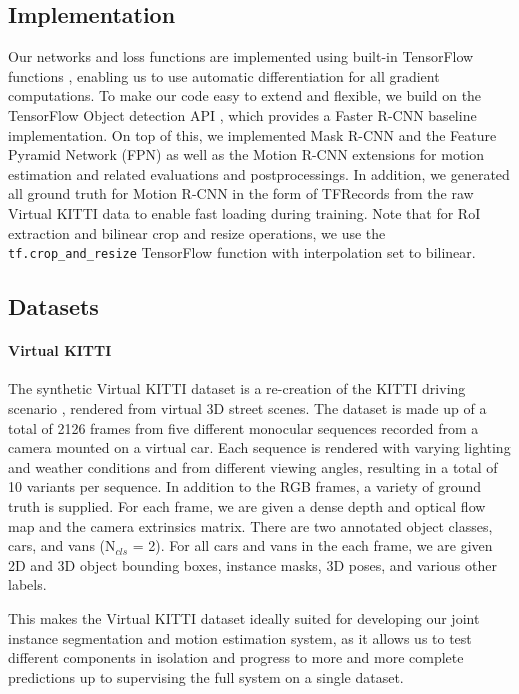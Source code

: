 \subsection{Implementation}
Our networks and loss functions are implemented using built-in TensorFlow
functions \cite{TensorFlow}, enabling us to use automatic differentiation for all gradient
computations. To make our code easy to extend and flexible, we build on
the TensorFlow Object detection API \cite{TensorFlowObjectDetection}, which provides a Faster R-CNN baseline
implementation.
On top of this, we implemented Mask R-CNN and the Feature Pyramid Network (FPN)
as well as the Motion R-CNN extensions for motion estimation and related evaluations
and postprocessings. In addition, we generated all ground truth for
Motion R-CNN in the form of TFRecords from the raw Virtual KITTI
data to enable fast loading during training.
Note that for RoI extraction and bilinear crop and resize operations,
we use the \texttt{tf.crop\_and\_resize} TensorFlow function with
interpolation set to bilinear.

\subsection{Datasets}
\label{ssec:datasets}

\paragraph{Virtual KITTI}
The synthetic Virtual KITTI dataset \cite{VKITTI} is a re-creation of the KITTI
driving scenario \cite{KITTI2012, KITTI2015}, rendered from virtual 3D street
scenes.
The dataset is made up of a total of 2126 frames from five different monocular
sequences recorded from a camera mounted on a virtual car.
Each sequence is rendered with varying lighting and weather conditions and
from different viewing angles, resulting in a total of 10 variants per sequence.
In addition to the RGB frames, a variety of ground truth is supplied.
For each frame, we are given a dense depth and optical flow map and the camera
extrinsics matrix. There are two annotated object classes, cars, and vans (N$_{cls}$ = 2).
For all cars and vans in the each frame, we are given 2D and 3D object bounding
boxes, instance masks, 3D poses, and various other labels.

This makes the Virtual KITTI dataset ideally suited for developing our joint
instance segmentation and motion estimation system, as it allows us to test
different components in isolation and progress to more and more complete
predictions up to supervising the full system on a single dataset.

